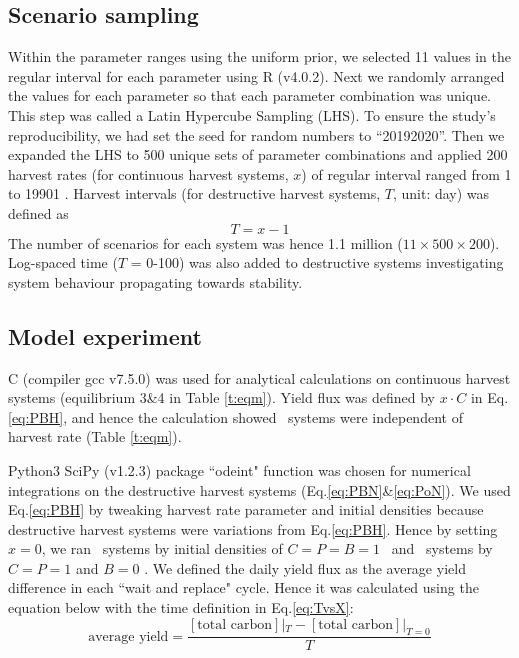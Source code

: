 \documentclass[../thesis.tex]{subfiles} %
\begin{document}
\subsection{Scenario sampling}
Within the parameter ranges using the uniform prior, we selected 11 values in the regular interval for each parameter using R (v4.0.2).  Next we randomly arranged the values for each parameter so that each parameter combination was unique.  This step was called a Latin Hypercube Sampling (LHS).  To ensure the study’s reproducibility, we had set the seed for random numbers to ``20192020”.  Then we expanded the LHS to 500 unique sets of parameter combinations and applied 200 harvest rates (for continuous harvest systems, $x$) of regular interval ranged from 1 to 19901 \dayU.  Harvest intervals (for destructive harvest systems, $T$, unit: day) was defined as
\begin{equation}
    T = x-1
    \label{eq:TvsX}
\end{equation}
The number of scenarios for each system was hence 1.1 million ($11\times500\times200$).  Log-spaced time ($T$ = 0-100) was also added to destructive systems investigating system behaviour propagating towards stability.

\subsection{Model experiment}
C (compiler gcc v7.5.0) was used for analytical calculations on continuous harvest systems (equilibrium 3\&4 in Table \ref{t:eqm}).  Yield flux was defined by $x\cdot C$ in Eq.\ref{eq:PBH}, and hence the calculation showed \PoH\ systems were independent of harvest rate (Table \ref{t:eqm}).

Python3 SciPy (v1.2.3) package ``odeint" function was chosen for numerical integrations on the destructive harvest systems (Eq.\ref{eq:PBN}\&\ref{eq:PoN}).  We used Eq.\ref{eq:PBH} by tweaking harvest rate parameter and initial densities because destructive harvest systems were variations from Eq.\ref{eq:PBH}.  Hence by setting $x=0$, we ran \PBN\ systems by initial densities of $C=P=B=1$ \den\ and \PoN\ systems by $C=P=1$ and $B=0$ \den.  We defined the daily yield flux as the average yield difference in each ``wait and replace" cycle.  Hence it was calculated using the equation below with the time definition in Eq.\ref{eq:TvsX}:
\begin{equation}
    \text{average yield} = \dfrac{[\text{total carbon}]|_{T}-[\text{total carbon}]|_{T=0}}{T}
    \label{eq:avgYd}
\end{equation}
\end{document}
